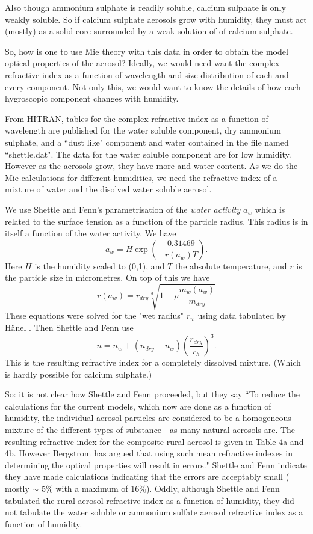 \documentclass[12pt]{article}
\begin{document}
Also though ammonium sulphate is readily soluble, calcium sulphate
is only weakly soluble. So if calcium  sulphate aerosols grow with humidity, they must
act (mostly) as a solid core surrounded by a weak solution of of calcium sulphate.

So, how is one to use Mie theory with this data in order to obtain the model
optical properties of the aerosol? Ideally, we would need want the complex
refractive index as a function of wavelength and size distribution of each and every component.
Not only this, we would want to know the details of how each hygroscopic component
changes with humidity.


From HITRAN,  tables for the complex refractive index as a function of wavelength
are published for the water soluble component, dry ammonium sulphate, and a ``dust like" component
and  water contained in the file named ``shettle.dat".  The data for
the water soluble component are for low humidity. However as the
aerosols grow, they have more and water content. As we do the Mie
calculations for different humidities, we need the refractive index of a mixture
of  water and the disolved water soluble aerosol. 


We use Shettle and Fenn's parametrisation of the
{\it water activity} $a_w$ which is related to the surface tension as 
a function
of the particle radius. This radius is in itself a function of the water
 activity. We have
\begin{equation}
a_w=H \exp \left ( -\frac{0.31469}{r(a_w) T} \right).
\end{equation}
Here $H$ is the humidity scaled to (0,1), and  $T$ the absolute temperature, and $r$ is the particle
size in micrometres.
On top of this we have
\begin{equation}
r(a_w)= r_{dry}\sqrt[3]{1+\rho \frac{ m_w(a_w)}{m_{dry}}}
\end{equation}
These equations were solved for the "wet radius" $r_w$ using data tabulated by H\"anel \cite{Hanel:Mybib}. Then Shettle and Fenn
use
\begin{equation}
n=n_w+(n_{dry}-n_w) \left ( \frac{r_{dry}}{r_h} \right )^3.
\end{equation}
This is the resulting refractive index for a completely dissolved mixture. 
(Which is hardly possible for calcium sulphate.)

So: it is not clear how Shettle and Fenn proceeded, but they say ``To reduce the
calculations for the current models, which now are done as a function of
humidity, the individual aerosol particles are considered to be a homogeneous
mixture of the different types of substance - as many natural aerosols are. The
resulting  refractive index for the composite rural aerosol is given
 in Table 4a and 4b. However Bergstrom has argued that using such mean 
refractive indexes  in determining the optical properties will result in errors." Shettle and 
Fenn indicate they have made calculations indicating that the errors
are acceptably small ( mostly $\sim$ 5\% with a maximum of 16\%). Oddly, although Shettle and Fenn tabulated
the rural aerosol refractive index as a function of humidity, they did not tabulate
the water soluble or ammonium sulfate aerosol refractive index as a function of
humidity.
\end{document}
